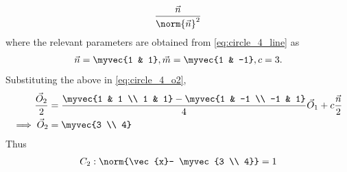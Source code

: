 \begin{enumerate}[label=\arabic*.,ref=\thesubsection.\theenumi]
\begin{align}
\frac{\vec{n}}{\norm{\vec{n}}^2}
\end{align}
%
where the relevant parameters are obtained from \eqref{eq:circle_4_line} as
\begin{align}
\vec{n} =  \myvec{1 & 1}, \vec{m} =  \myvec{1 & -1}, c = 3.
\end{align}
%
Substituting the above in \eqref{eq:circle_4_o2},
\begin{align}
\label{eq:circle_4_o2_final}
\frac{\vec{O}_2}{2} &= \frac{\myvec{1 & 1 \\ 1 & 1}-\myvec{1 & -1 \\ -1 & 1}}{4}\vec{O}_1 + c 
\frac{\vec{n}}{2}
\nonumber \\
\implies \vec{O}_2 &= \myvec{3 \\ 4}
\end{align}
%
Thus
\begin{align}
C_2: \norm{\vec{x}- \myvec{3 \\ 4}} = 1
\label{eq:circle_4_c2}
\end{align}


\end{enumerate}
